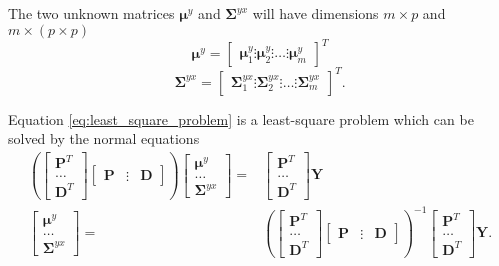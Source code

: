 The two unknown matrices $\boldsymbol{\mu}^y$ and $\mathbf{\Sigma}^{yx}$ will have dimensions $m\times p$ and $m \times (p\times p)$ 
\begin{equation}
	\label{eq:v_matrix}
	\boldsymbol{\mu}^y = 
	\begin{bmatrix}
		\boldsymbol{\mu}^y_1 \vdots \boldsymbol{\mu}^y_2 \vdots \dots \vdots \boldsymbol{\mu}^y_m
	\end{bmatrix}^T
\end{equation}
\begin{equation}
	\label{gamma_matrix}
	\mathbf{\Sigma}^{yx} = 
	\begin{bmatrix}
		\mathbf{\Sigma}_1^{yx} \vdots \mathbf{\Sigma}_2^{yx} \vdots \dots \vdots \mathbf{\Sigma}_m^{yx}
	\end{bmatrix}^T.
\end{equation}

Equation \eqref{eq:least_square_problem} is a least-square problem which can be solved by the normal equations \cite{lawson74}
\begin{equation}
	\label{eq:param_computed}
	\begin{split}
		\left( 
		\begin{bmatrix}
			\mathbf{P}^T \\
			\dots \\
			\mathbf{D}^T
		\end{bmatrix}
		\begin{bmatrix}
			\mathbf{P} & \vdots & \mathbf{D}
		\end{bmatrix}
		 \right)
		\begin{bmatrix}
			\boldsymbol{\mu}^y \\
			\dots \\
			\mathbf{\Sigma}^{yx}
		\end{bmatrix}
		= &
		\begin{bmatrix}
			\mathbf{P}^T \\
			\dots \\
			\mathbf{D}^T
		\end{bmatrix}
		\mathbf{Y} \\ %
		\begin{bmatrix}
			\boldsymbol{\mu}^y \\
			\dots \\
			\mathbf{\Sigma}^{yx}
		\end{bmatrix}
		= &
		\left( 
		\begin{bmatrix}
			\mathbf{P}^T \\
			\dots \\
			\mathbf{D}^T
		\end{bmatrix}
		\begin{bmatrix}
			\mathbf{P} & \vdots & \mathbf{D}
		\end{bmatrix}
		 \right)^{-1}
		\begin{bmatrix}
			\mathbf{P}^T \\
			\dots \\
			\mathbf{D}^T
		\end{bmatrix}
		\mathbf{Y}. \\ %
	\end{split}
\end{equation}


